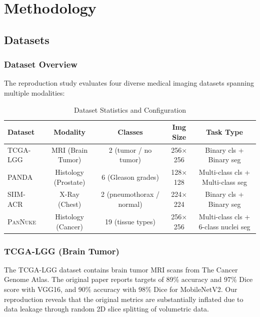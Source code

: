 \documentclass[11pt,a4paper,twoside]{report}
\newcommand{\dataset}[1]{\textsc{#1}}
\begin{document}
\chapter{Methodology}\label{chap:methodology}

\section{Datasets}

\subsection{Dataset Overview}

The reproduction study evaluates four diverse medical imaging datasets spanning multiple modalities:

\begin{table}[htbp]
\centering
\caption{Dataset Statistics and Configuration}
\label{tab:dataset_stats}
\begin{tabular}{lcccc}
\toprule
\textbf{Dataset} & \textbf{Modality} & \textbf{Classes} & \textbf{Img Size} & \textbf{Task Type} \\
\midrule
\dataset{TCGA}-LGG & MRI (Brain Tumor) & 2 (tumor / no tumor) & 256$\times$256 & Binary cls + Binary seg \\
\dataset{PANDA} & Histology (Prostate) & 6 (Gleason grades) & 128$\times$128 & Multi-class cls + Multi-class seg \\
\dataset{SIIM}-ACR & X-Ray (Chest) & 2 (pneumothorax / normal) & 224$\times$224 & Binary cls + Binary seg \\
\dataset{PanNuke} & Histology (Cancer) & 19 (tissue types) & 256$\times$256 & Multi-class cls + 6-class nuclei seg \\
\bottomrule
\end{tabular}
\end{table}

\subsection{TCGA-LGG (Brain Tumor)}

The \dataset{TCGA}-LGG dataset contains brain tumor MRI scans from The Cancer Genome Atlas. The original paper reports targets of 89\% accuracy and 97\% Dice score with VGG16, and 90\% accuracy with 98\% Dice for MobileNetV2. Our reproduction reveals that the original metrics are substantially inflated due to data leakage through random 2D slice splitting of volumetric data.
\end{document}
